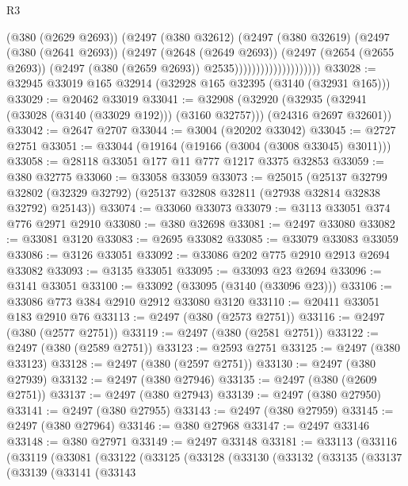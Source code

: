 \begin{lexlean}{R3}
\begin{coremodule}
                                (@380 (@2629 @2693))
                                (@2497
                                  (@380 @32612)
                                  (@2497
                                    (@380 @32619)
                                    (@2497
                                      (@380 (@2641 @2693))
                                      (@2497
                                        (@2648 (@2649 @2693))
                                        (@2497
                                          (@2654 (@2655 @2693))
                                          (@2497 (@380 (@2659 @2693)) @2535))))))))))))))))))))
@33028 := @32945 @33019 @165 @32914 (@32928 @165 @32395 (@3140 (@32931 @165)))
@33029 := @20462 @33019
@33041 := @32908
    (@32920 (@32935 (@32941 (@33028 (@3140 (@33029 @192))) (@3160 @32757))) (@24316 @2697 @32601))
@33042 := @2647 @2707
@33044 := @3004 (@20202 @33042)
@33045 := @2727 @2751
@33051 := @33044 (@19164 (@19166 (@3004 (@3008 @33045) @3011)))
@33058 := @28118 @33051 @177 @11 @777 @1217 @3375 @32853
@33059 := @380 @32775
@33060 := @33058 @33059
@33073 := @25015
    (@25137
      @32799
      @32802
      (@32329 @32792)
      (@25137 @32808 @32811 (@27938 @32814 @32838 @32792) @25143))
@33074 := @33060 @33073
@33079 := @3113 @33051 @374 @776 @2971 @2910
@33080 := @380 @32698
@33081 := @2497 @33080
@33082 := @33081 @3120
@33083 := @2695 @33082
@33085 := @33079 @33083 @33059
@33086 := @3126 @33051
@33092 := @33086 @202 @775 @2910 @2913 @2694 @33082
@33093 := @3135 @33051
@33095 := @33093 @23 @2694
@33096 := @3141 @33051
@33100 := @33092 (@33095 (@3140 (@33096 @23)))
@33106 := @33086 @773 @384 @2910 @2912 @33080 @3120
@33110 := @20411 @33051 @183 @2910 @76
@33113 := @2497 (@380 (@2573 @2751))
@33116 := @2497 (@380 (@2577 @2751))
@33119 := @2497 (@380 (@2581 @2751))
@33122 := @2497 (@380 (@2589 @2751))
@33123 := @2593 @2751
@33125 := @2497 (@380 @33123)
@33128 := @2497 (@380 (@2597 @2751))
@33130 := @2497 (@380 @27939)
@33132 := @2497 (@380 @27946)
@33135 := @2497 (@380 (@2609 @2751))
@33137 := @2497 (@380 @27943)
@33139 := @2497 (@380 @27950)
@33141 := @2497 (@380 @27955)
@33143 := @2497 (@380 @27959)
@33145 := @2497 (@380 @27964)
@33146 := @380 @27968
@33147 := @2497 @33146
@33148 := @380 @27971
@33149 := @2497 @33148
@33181 := @33113
    (@33116
      (@33119
        (@33081
          (@33122
            (@33125
              (@33128
                (@33130
                  (@33132
                    (@33135
                      (@33137
                        (@33139
                          (@33141
                            (@33143

\end{coremodule}
\end{lexlean}
